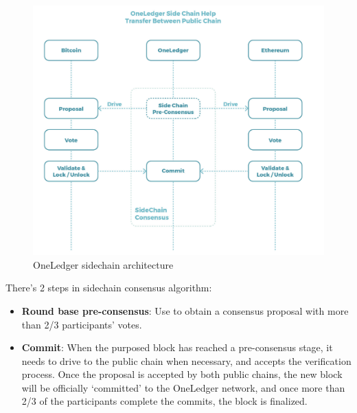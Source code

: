         \begin{figure}[H]
        \includegraphics[width=1\textwidth]{./figures/oneledger.png}
        \centering
        \caption{{OneLedger sidechain architecture}\protect\footnotemark}
        \centering
        \label{fig:oneledger}
        
        \end{figure}
\noindent There's 2 steps in sidechain consensus algorithm:
\begin{itemize}
    \item \textbf{Round base pre-consensus}: Use to obtain a consensus proposal with more than 2/3 participants' votes.
    \item \textbf{Commit}: When the purposed block has reached a pre-consensus stage, it needs to drive to the public chain when necessary, and accepts the verification process. Once the proposal is accepted by both public chains, the new block will be officially `committed' to the OneLedger network, and once more than 2/3 of the participants complete the commits, the block is finalized. 
\end{itemize}
